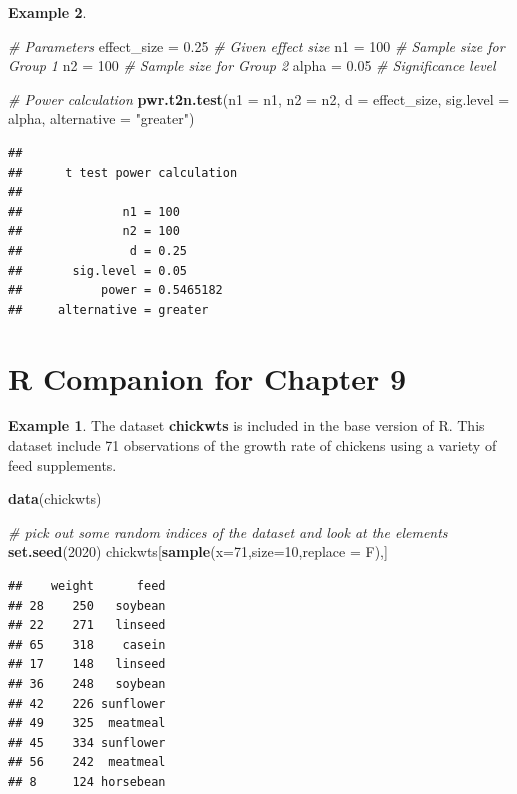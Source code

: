 \documentclass[
  11pt,
  oneside]{book}
\newenvironment{Shaded}{\begin{snugshade}}{\end{snugshade}}
\newcommand{\AttributeTok}[1]{\textcolor[rgb]{0.13,0.29,0.53}{#1}}
\newcommand{\CommentTok}[1]{\textcolor[rgb]{0.56,0.35,0.01}{\textit{#1}}}
\newcommand{\DecValTok}[1]{\textcolor[rgb]{0.00,0.00,0.81}{#1}}
\newcommand{\FloatTok}[1]{\textcolor[rgb]{0.00,0.00,0.81}{#1}}
\newcommand{\FunctionTok}[1]{\textcolor[rgb]{0.13,0.29,0.53}{\textbf{#1}}}
\newcommand{\NormalTok}[1]{#1}
\newcommand{\OtherTok}[1]{\textcolor[rgb]{0.56,0.35,0.01}{#1}}
\newcommand{\StringTok}[1]{\textcolor[rgb]{0.31,0.60,0.02}{#1}}
\theoremstyle{definition}
\theoremstyle{definition}
\newtheorem{example}{Example}[chapter]
\theoremstyle{definition}
\theoremstyle{definition}
\theoremstyle{remark}
\begin{document}
\begin{example}
\begin{Shaded}
\begin{Highlighting}[]
\CommentTok{\# Parameters}
\NormalTok{effect\_size }\OtherTok{=} \FloatTok{0.25}  \CommentTok{\# Given effect size}
\NormalTok{n1 }\OtherTok{=} \DecValTok{100}  \CommentTok{\# Sample size for Group 1}
\NormalTok{n2 }\OtherTok{=} \DecValTok{100}  \CommentTok{\# Sample size for Group 2}
\NormalTok{alpha }\OtherTok{=} \FloatTok{0.05}  \CommentTok{\# Significance level}

\CommentTok{\# Power calculation}
\FunctionTok{pwr.t2n.test}\NormalTok{(}\AttributeTok{n1 =}\NormalTok{ n1, }\AttributeTok{n2 =}\NormalTok{ n2, }\AttributeTok{d =}\NormalTok{ effect\_size, }
                      \AttributeTok{sig.level =}\NormalTok{ alpha, }\AttributeTok{alternative =} \StringTok{"greater"}\NormalTok{)}
\end{Highlighting}
\end{Shaded}

\begin{verbatim}
## 
##      t test power calculation 
## 
##              n1 = 100
##              n2 = 100
##               d = 0.25
##       sig.level = 0.05
##           power = 0.5465182
##     alternative = greater
\end{verbatim}

\newpage

\section{R Companion for Chapter 9}\label{r-companion-for-chapter-9}

\begin{example}
The dataset \textbf{chickwts} is included in the base version of R. This dataset include 71 observations of the growth rate of chickens using a variety of feed supplements.
\end{example}

\begin{Shaded}
\begin{Highlighting}[]
\FunctionTok{data}\NormalTok{(chickwts)}

\CommentTok{\# pick out some random indices of the dataset and look at the elements}
\FunctionTok{set.seed}\NormalTok{(}\DecValTok{2020}\NormalTok{)}
\NormalTok{chickwts[}\FunctionTok{sample}\NormalTok{(}\AttributeTok{x=}\DecValTok{71}\NormalTok{,}\AttributeTok{size=}\DecValTok{10}\NormalTok{,}\AttributeTok{replace =}\NormalTok{ F),]}
\end{Highlighting}
\end{Shaded}

\begin{verbatim}
##    weight      feed
## 28    250   soybean
## 22    271   linseed
## 65    318    casein
## 17    148   linseed
## 36    248   soybean
## 42    226 sunflower
## 49    325  meatmeal
## 45    334 sunflower
## 56    242  meatmeal
## 8     124 horsebean
\end{verbatim}


\end{example}
\end{document}
